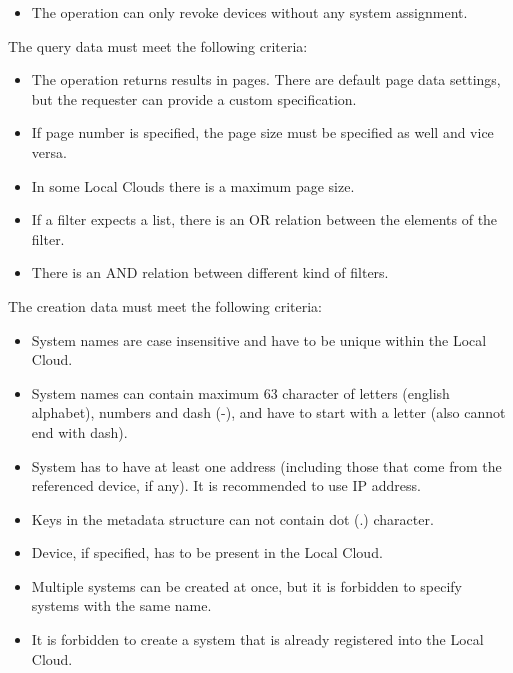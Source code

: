 \documentclass[a4paper]{arrowhead}
\begin{document}
\begin{itemize}
    \item The operation can only revoke devices without any system assignment.
\end{itemize}


The query data must meet the following criteria:

\begin{itemize}
    \item The operation returns results in pages. There are default page data settings, but the requester can provide a custom specification.
    \item If page number is specified, the page size must be specified as well and vice versa.
    \item In some Local Clouds there is a maximum page size.
    \item If a filter expects a list, there is an OR relation between the elements of the filter.
    \item There is an AND relation between different kind of filters.
\end{itemize}


The creation data must meet the following criteria:

\begin{itemize}
    \item System names are case insensitive and have to be unique within the Local Cloud.
    \item System names can contain maximum 63 character of letters (english alphabet), numbers and dash (-), and have to start with a letter (also cannot end with dash).
    \item System has to have at least one address (including those that come from the referenced device, if any). It is recommended to use IP address. 
    \item Keys in the metadata structure can not contain dot (.) character.
    \item Device, if specified, has to be present in the Local Cloud.
    \item Multiple systems can be created at once, but it is forbidden to specify systems with the same name.
    \item It is forbidden to create a system that is already registered into the Local Cloud.
\end{itemize}
\end{document}
